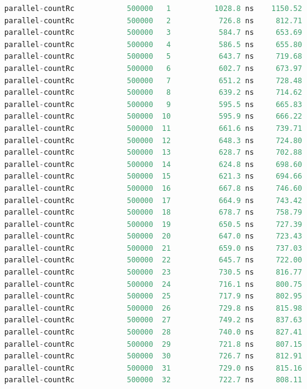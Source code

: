 \documentclass[format=acmsmall, review=false, screen=true]{acmart}
\begin{document}
\begin{lstlisting}[language=java]
parallel-countRc            500000   1          1028.8 ns    1150.52          4
parallel-countRc            500000   2           726.8 ns     812.71          4
parallel-countRc            500000   3           584.7 ns     653.69          4
parallel-countRc            500000   4           586.5 ns     655.80          4
parallel-countRc            500000   5           643.7 ns     719.68          4
parallel-countRc            500000   6           602.7 ns     673.97          4
parallel-countRc            500000   7           651.2 ns     728.48          4
parallel-countRc            500000   8           639.2 ns     714.62          4
parallel-countRc            500000   9           595.5 ns     665.83          4
parallel-countRc            500000  10           595.9 ns     666.22          4
parallel-countRc            500000  11           661.6 ns     739.71          4
parallel-countRc            500000  12           648.3 ns     724.80          4
parallel-countRc            500000  13           628.7 ns     702.88          4
parallel-countRc            500000  14           624.8 ns     698.60          4
parallel-countRc            500000  15           621.3 ns     694.66          4
parallel-countRc            500000  16           667.8 ns     746.60          4
parallel-countRc            500000  17           664.9 ns     743.42          4
parallel-countRc            500000  18           678.7 ns     758.79          4
parallel-countRc            500000  19           650.5 ns     727.39          4
parallel-countRc            500000  20           647.0 ns     723.43          4
parallel-countRc            500000  21           659.0 ns     737.03          4
parallel-countRc            500000  22           645.7 ns     722.00          4
parallel-countRc            500000  23           730.5 ns     816.77          4
parallel-countRc            500000  24           716.1 ns     800.75          4
parallel-countRc            500000  25           717.9 ns     802.95          4
parallel-countRc            500000  26           729.8 ns     815.98          4
parallel-countRc            500000  27           749.2 ns     837.63          4
parallel-countRc            500000  28           740.0 ns     827.41          4
parallel-countRc            500000  29           721.8 ns     807.15          4
parallel-countRc            500000  30           726.7 ns     812.91          4
parallel-countRc            500000  31           729.0 ns     815.16          4
parallel-countRc            500000  32           722.7 ns     808.11          4
\end{lstlisting}
\end{document}
